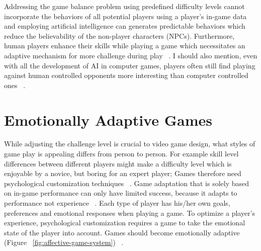 Addressing the game balance problem using predefined difficulty levels cannot incorporate the behaviors of all potential players using a player's in-game data and employing artificial intelligence can generates predictable behaviors which reduce the believability of the non-player characters (NPCs). Furthermore, human players enhance their skills while playing a game which necessitates an adaptive mechanism for more challenge during play ~\cite{olesen2008real}. I should also mention, even with all the development of AI in computer games, players often still find playing against human controlled opponents more interesting than computer controlled ones ~\cite{weibel2008playing}.

\section{Emotionally Adaptive Games}
While adjusting the challenge level is crucial to video game design, what styles of game play is appealing differs from person to person. For example skill level differences between different players might make a difficulty level which is enjoyable by a novice, but boring for an expert player; Games therefore need psychological customization techniques ~\cite{saari2005towards}. Game adaptation that is solely based on in-game performance can only have limited success, because it adapts to performance not experience ~\cite{bartle1996hearts}. Each type of player has his/her own goals, preferences and emotional responses when playing a game. To optimize a player's experience, psychological customization requires a game to take the emotional state of the player into account. Games should become emotionally adaptive (Figure ~\ref{fig:affective-game-system}) ~\cite{tijs2009creating}.

